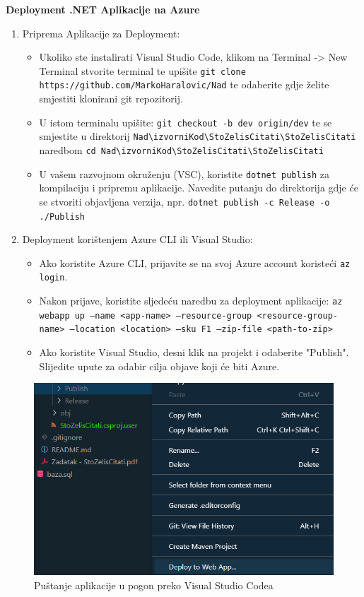 				\textbf{Deployment .NET Aplikacije na Azure}
				\begin{enumerate}
					\item Priprema Aplikacije za Deployment:
					\begin{itemize}
						\item Ukoliko ste instalirati Visual Studio Code, klikom na Terminal -> New Terminal stvorite terminal te upišite \texttt{git clone https://github.com/MarkoHaralovic/Nad} te odaberite gdje želite smjestiti klonirani git repozitorij.
						\item U istom terminalu upišite: \texttt{git checkout -b dev origin/dev} te se smjestite u direktorij \texttt{Nad\textbackslash izvorniKod\textbackslash StoZelisCitati\textbackslash StoZelisCitati} naredbom \texttt{cd Nad\textbackslash izvorniKod\textbackslash StoZelisCitati\textbackslash StoZelisCitati}
						\item U vašem razvojnom okruženju (VSC), koristite \texttt{dotnet publish} za kompilaciju i pripremu aplikacije. Navedite putanju do direktorija gdje će se stvoriti objavljena verzija, npr. \texttt{dotnet publish -c Release -o ./Publish}
					\end{itemize}
					\item Deployment korištenjem Azure CLI ili Visual Studio:
					\begin{itemize}
						\item Ako koristite Azure CLI, prijavite se na svoj Azure account koristeći \texttt{az login}.
						\item Nakon prijave, koristite sljedeću naredbu za deployment aplikacije: \texttt{az webapp up --name <app-name> --resource-group <resource-group-name> --location <location> --sku F1 --zip-file <path-to-zip>}
						\item Ako koristite Visual Studio, desni klik na projekt i odaberite "Publish". Slijedite upute za odabir cilja objave koji će biti Azure.
					\end{itemize}
				\end{enumerate}

				\begin{figure}[hbt!]
					\centering
					\includegraphics[width=\textwidth]{slike/deployment.png}
					\caption{Puštanje aplikacije u pogon preko Visual Studio Codea}
					\label{fig:vscode-deployment}
			   \end{figure}
			  

